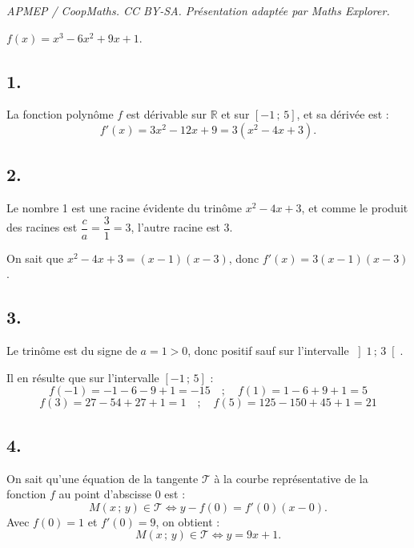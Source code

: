\documentclass[10pt]{article}
\begin{document}
\noindent\textit{APMEP / CoopMaths. CC BY-SA. Présentation adaptée par Maths Explorer.}\par\medskip
\(f(x) = x^3 - 6x^2 + 9x + 1\).

\subsection*{1.}

La fonction polynôme \(f\) est dérivable sur \(\mathbb{R}\) et sur \([-1\,;\,5]\), et sa dérivée est :
\[
f'(x) = 3x^2 - 12x + 9 = 3(x^2 - 4x + 3).
\]

\subsection*{2.}

Le nombre 1 est une racine évidente du trinôme \(x^2 - 4x + 3\), et comme le produit des racines est \(\dfrac{c}{a} = \dfrac{3}{1} = 3\), l'autre racine est 3.

On sait que \(x^2 - 4x + 3 = (x - 1)(x - 3)\), donc \(f'(x) = 3(x - 1)(x - 3)\).

\subsection*{3.}

Le trinôme est du signe de \(a = 1 > 0\), donc positif sauf sur l'intervalle \(\left]1\,;\,3\right[\).  

Il en résulte que sur l'intervalle \([-1\,;\,5]\) :
\[f(-1) = -1 - 6 - 9 + 1 = -15 \quad ; \quad f(1) = 1 - 6 + 9 + 1 = 5\]
\[f(3) = 27 - 54 + 27 + 1 = 1 \quad ; \quad f(5) = 125 - 150 + 45 + 1 = 21\]
\begin{center}
\end{center}

\subsection*{4.}

On sait qu'une équation de la tangente \(\mathcal{T}\) à la courbe représentative de la fonction \(f\) au point d'abscisse \(0\) est :
\[
M(x\,;\,y) \in \mathcal{T} \iff y - f(0) = f'(0)(x - 0).
\]
Avec \(f(0) = 1\) et \(f'(0) = 9\), on obtient :
\[
M(x\,;\,y) \in \mathcal{T} \iff y = 9x + 1.
\]
\end{document}
